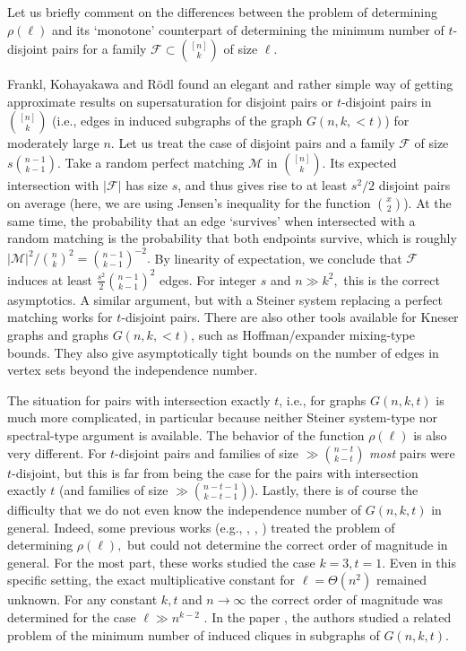 \documentclass[12pt,a4paper]{article}
\newcommand{\ff}{\mathcal{F}}
\begin{document}
Let us briefly comment on the differences between the problem of determining $\rho(\ell)$ and its `monotone' counterpart of determining the minimum number of $t$-disjoint pairs for a family $\ff\subset {[n]\choose k}$ of size $\ell.$


Frankl, Kohayakawa and R\"odl \cite{FKR} found an elegant and rather simple way of getting approximate results on supersaturation for disjoint pairs or $t$-disjoint pairs in ${[n]\choose k}$ (i.e., edges in induced subgraphs of the graph $G(n,k,< t)$) for moderately large $n$. Let us treat the case of disjoint pairs and a family $\ff$ of size $s{n-1\choose k-1}$. Take a random perfect matching $\mathcal M$ in ${[n]\choose k}$. Its expected intersection with $|\ff|$ has size $s$, and thus gives rise to at least $s^2/2$ disjoint pairs on average (here, we are using Jensen's inequality for the function ${x\choose 2}$). At the same time, the probability that an edge `survives' when intersected with a random matching is the probability that both endpoints survive, which is roughly $|\mathcal M|^2/{n\choose k}^2 = {n-1\choose k-1}^{-2}.$ By linearity of expectation, we conclude that $\ff$ induces at least $\frac{s^2}2{n-1\choose k-1}^2$ edges. For integer $s$ and $n\gg k^2,$ this is the correct asymptotics. A similar argument, but with a Steiner system replacing a perfect matching works for $t$-disjoint pairs. There are also other tools available for Kneser graphs and graphs $G(n,k,< t)$, such as Hoffman/expander mixing-type bounds. They also give asymptotically tight bounds on the number of edges in vertex sets beyond the independence number.

The situation for pairs with intersection exactly $t$, i.e., for graphs $G(n,k,t)$ is much more complicated, in particular because neither Steiner system-type nor spectral-type argument is available. The behavior of the function $\rho(\ell)$ is also very different. For $t$-disjoint pairs and families of size $\gg {n-t\choose k-t}$ {\it most} pairs were $t$-disjoint, but this is far from being the case for the pairs with intersection exactly $t$ (and families of size $\gg {n-t-1\choose k-t-1}$). Lastly, there is of course the difficulty that we do not even know the independence number of $G(n,k,t)$ in general. Indeed, some previous works (e.g., \cite{YS}, \cite{DNRS}, \cite{Push}) treated the problem of determining $\rho(\ell),$ but could not determine the correct order of magnitude in general. For the most part, these works studied the case $k=3, t=1$.  Even in this specific setting, the exact multiplicative constant for $\ell = \Theta(n^2)$ remained unknown. For  any constant $k,t$ and $n\to \infty$  the correct order of magnitude was determined for the case $\ell \gg n^{k-2}$ \cite{YS2}. In the paper \cite{DNRS2}, the authors studied a related problem of the minimum number of induced cliques in subgraphs of $G(n,k,t)$.
\end{document}
